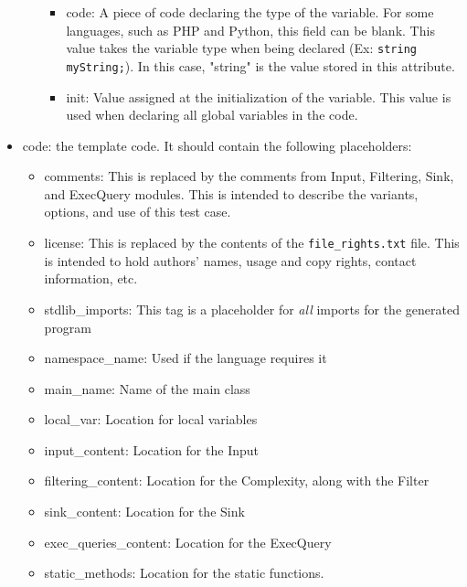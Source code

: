 \documentclass[12pt]{article}
\begin{document}
\begin{itemize}
\begin{itemize}
\begin{itemize}
        \item code: A piece of code declaring the type of the variable. For 
        some languages, such as PHP and Python, this field can be blank. 
        This value takes the variable type when being declared 
        (Ex: \verb|string myString;|). In this case, "string" is the 
        value stored in this attribute.

        \item init: Value assigned at the initialization of the variable. 
        This value is used when declaring all global variables in the code.
        \end{itemize}
    \end{itemize}
    
    \item code: the template code. It should contain the 
    following placeholders:
    \begin{itemize}
        \item comments: This is replaced by the comments from Input,
        Filtering, Sink, and ExecQuery modules. This is intended to
        describe the variants, options, and use of this test case. 
        
        \item license: This is replaced by the contents of the
        \verb|file_rights.txt| file.  This is intended to hold
        authors' names, usage and copy rights, contact information, 
        etc.
        
        \item stdlib\_imports:  This tag is a placeholder for 
        \emph{all} imports for the generated program

        \item namespace\_name:  Used if the language requires it

        \item main\_name:  Name of the main class

        \item local\_var:  Location for local variables

        \item input\_content:  Location for the Input

        \item filtering\_content:  Location for the Complexity, along 
        with the Filter

        \item sink\_content:  Location for the Sink

        \item exec\_queries\_content:  Location for the ExecQuery

        \item static\_methods:  Location for the static functions.
    \end{itemize}
\end{itemize}
\end{document}
